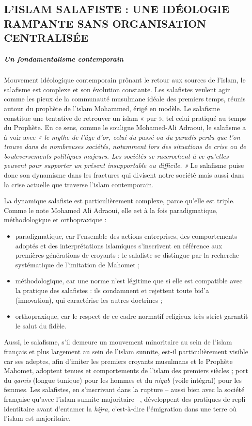 \subsection{L'ISLAM SALAFISTE : UNE
IDÉOLOGIE RAMPANTE SANS ORGANISATION CENTRALISÉE}



\subparagraph{Un fondamentalisme
contemporain}


Mouvement idéologique contemporain prônant le retour aux sources de
l'islam, le salafisme est complexe et son évolution constante. Les
salafistes veulent agir comme les pieux de la communauté musulmane
idéale des premiers temps, réunis autour du prophète de l'islam
Mohammed, érigé en modèle. Le salafisme constitue une tentative de
retrouver un islam « pur », tel celui pratiqué au temps du Prophète. En
ce sens, comme le souligne Mohamed-Ali Adraoui, le salafisme a à voir
avec \emph{« le mythe de l'âge d'or, celui du passé ou du paradis perdu
que l'on trouve dans de nombreuses sociétés, notamment lors des
situations de crise ou de bouleversements politiques majeurs. Les
sociétés se raccrochent à ce qu'elles peuvent pour supporter un présent
insupportable ou difficile. »} Le salafisme puise donc son dynamisme
dans les fractures qui divisent notre société mais aussi dans la crise
actuelle que traverse l'islam contemporain.

La dynamique salafiste est particulièrement complexe, parce qu'elle est
triple. Comme le note Mohamed Ali Adraoui, elle est à la fois
paradigmatique, méthodologique et orthopraxique :


\begin{itemize}
\item
  paradigmatique, car l'ensemble des actions entreprises, des
  comportements adoptés et des interprétations islamiques s'inscrivent
  en référence aux premières générations de croyants : le salafiste se
  distingue par la recherche systématique de l'imitation de Mahomet ;
\item
  méthodologique, car une norme n'est légitime que si elle est
  compatible avec la pratique des salafistes : ils condamnent et
  rejettent toute bid'a (innovation), qui caractérise les autres
  doctrines ;
\item
  
  orthopraxique, car le respect de ce cadre normatif religieux très
  strict garantit le salut du fidèle.
  
\end{itemize}


Aussi, le salafisme, s'il demeure un mouvement minoritaire au sein de
l'islam français et plus largement au sein de l'islam sunnite, est-il
particulièrement visible car ses adeptes, afin d'imiter les premiers
croyants musulmans et le Prophète Mahomet, adoptent tenues et
comportements de l'islam des premiers siècles ; port du \emph{qamis}
(longue tunique) pour les hommes et du \emph{niqab} (voile intégral)
pour les femmes. Les salafistes, en s'inscrivant dans la rupture --
aussi bien avec la société française qu'avec l'islam sunnite majoritaire
--, développent des pratiques de repli identitaire avant d'entamer la
\emph{hijra}, c'est-à-dire l'émigration dans une terre où l'islam est
majoritaire.

